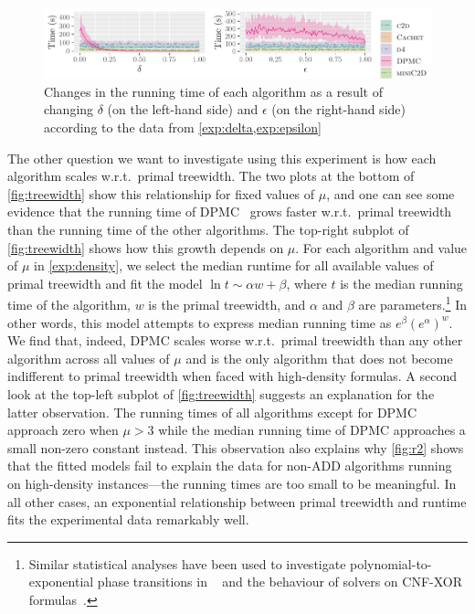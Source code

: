 \documentclass[letterpaper]{article} %
\theoremstyle{definition}
\theoremstyle{remark}
\begin{document}
\begin{figure}
  \centering
  \includegraphics{delta_epsilon}
  \caption{Changes in the running time of each algorithm as a result of changing
    $\delta$ (on the left-hand side) and $\epsilon$ (on the right-hand side)
    according to the data from
    \cref{exp:delta,exp:epsilon}}\label{fig:delta_epsilon}
\end{figure}

The other question we want to investigate using this experiment is how each
algorithm scales w.r.t.\ primal treewidth. The two plots at the bottom of
\cref{fig:treewidth} show this relationship for fixed values of $\mu$, and one
can see some evidence that the running time of
\textsc{DPMC}~\cite{DBLP:conf/cp/DudekPV20} grows faster w.r.t.\ primal treewidth
than the running time of the other algorithms. The top-right subplot of
\cref{fig:treewidth} shows how this growth depends on $\mu$. For each algorithm
and value of $\mu$ in \cref{exp:density}, we select the median runtime for all
available values of primal treewidth and fit the model $\ln t \sim \alpha w +
\beta$, where $t$ is the median running time of the algorithm, $w$ is the primal
treewidth, and $\alpha$ and $\beta$ are parameters.\footnote{Similar statistical
  analyses have been used to investigate polynomial-to-exponential phase
  transitions in \SAT{}~\cite{DBLP:journals/constraints/CoarfaDASV03} and the
  behaviour of \SAT{} solvers on CNF-XOR
  formulas~\cite{DBLP:conf/ijcai/DudekMV17}.} In other words, this model
attempts to express median running time as $e^\beta{(e^\alpha)}^w$. We find
that, indeed, \textsc{DPMC} scales worse w.r.t.\ primal treewidth than any other
algorithm across all values of $\mu$ and is the only algorithm that does not
become indifferent to primal treewidth when faced with high-density formulas. A
second look at the top-left subplot of \cref{fig:treewidth} suggests an
explanation for the latter observation. The running times of all algorithms
except for \textsc{DPMC} approach zero when $\mu > 3$ while the median running
time of \textsc{DPMC} approaches a small non-zero constant instead. This
observation also explains why \cref{fig:r2} shows that the fitted models fail to
explain the data for non-ADD algorithms running on high-density instances---the
running times are too small to be meaningful. In all other cases, an exponential
relationship between primal treewidth and runtime fits the experimental data
remarkably well.
\end{document}
